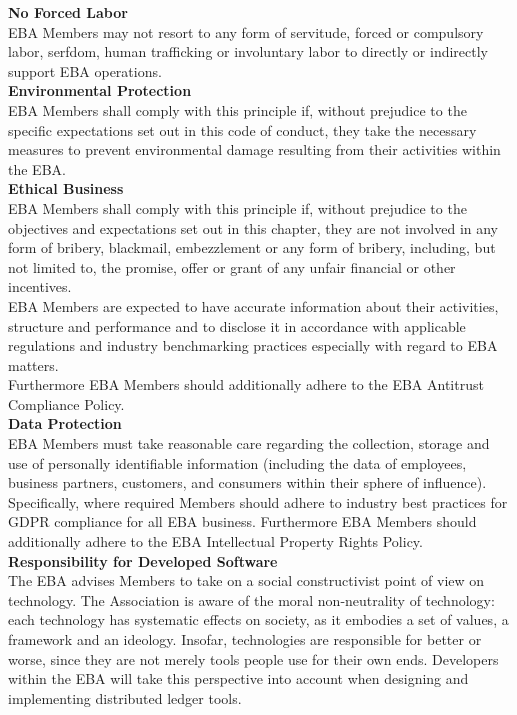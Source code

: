 \documentclass{article}
\begin{document}
\textbf{No Forced Labor} \\

EBA Members may not resort to any form of servitude, forced or compulsory labor, serfdom, human trafficking or involuntary labor to directly or indirectly support EBA operations. \\

\textbf{Environmental Protection} \\

EBA Members shall comply with this principle if, without prejudice to the specific expectations set out in this code of conduct, they take the necessary measures to prevent environmental damage resulting from their activities within the EBA. \\

\textbf{Ethical Business} \\

EBA Members shall comply with this principle if, without prejudice to the objectives and expectations set out in this chapter, they are not involved in any form of bribery, blackmail, embezzlement or any form of bribery, including, but not limited to, the promise, offer or grant of any unfair financial or other incentives.\\
EBA Members are expected to have accurate information about their activities, structure and performance and to disclose it in accordance with applicable regulations and industry benchmarking practices especially with regard to EBA matters. \\
Furthermore EBA Members should additionally adhere to the EBA Antitrust Compliance Policy. \\

\textbf{Data Protection} \\

EBA Members must take reasonable care regarding the collection, storage and use of personally identifiable information (including the data of employees, business partners, customers, and consumers within their sphere of influence). 
Specifically, where required Members should adhere to industry best practices for GDPR compliance for all EBA business. 
Furthermore EBA Members should additionally adhere to the EBA Intellectual Property Rights Policy. \\

\textbf{Responsibility for Developed Software} \\

The EBA advises Members to take on a social constructivist point of view on technology. 
The Association is aware of the moral non-neutrality of technology: each technology has systematic effects on society, as it embodies a set of values, a framework and an ideology. 
Insofar, technologies are responsible for better or worse, since they are not merely tools people use for their own ends. 
Developers within the EBA will take this perspective into account when designing and implementing distributed ledger tools.
\end{document}
